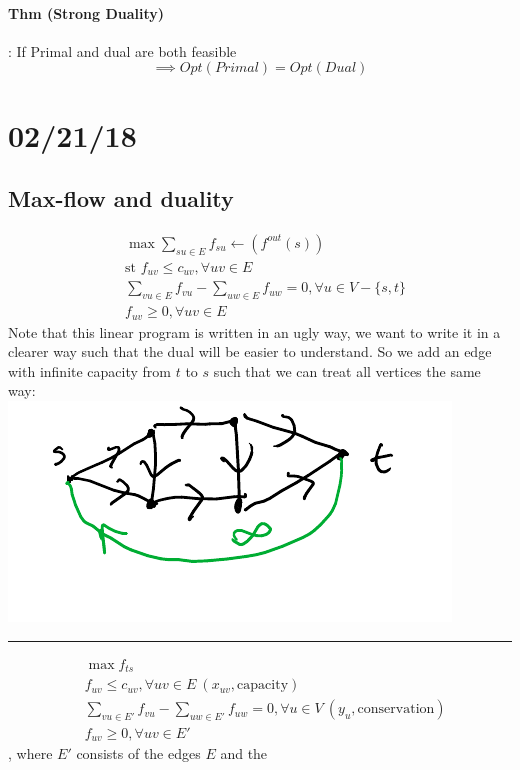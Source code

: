 \documentclass[12 pt]{article}
\begin{document}
          \paragraph{Thm (Strong Duality)}: If Primal and dual are
          both feasible $$\implies Opt(Primal) = Opt(Dual)$$
          \section{02/21/18}
          \subsection{Max-flow and duality}
          \begin{align*}
            &\max \sum_{su\in E} f_{su} \gets (f^{out}(s))
            \\ &\text{st }f_{uv} \leq c_{uv}, \forall uv \in E
            \\ &\sum_{vu\in E}f_{vu} - \sum_{uw \in E}f_{uw} = 0, \forall u \in V-\{s,t\}
            \\ &f_{uv} \geq 0, \forall uv \in E
          \end{align*}
          Note that this linear program is written in an ugly way, we
          want to write it in a clearer way such that the dual will
          be easier to understand. So we add an edge with infinite
          capacity from $t$ to $s$ such that we can treat all vertices
          the same way:
          \\ \includegraphics[width=.9\textwidth]{i110.pdf}
          \\ \noindent \rule{\textwidth}{0.5pt}
          \begin{align*}
            &\max f_{ts}
            \\ &f_{uv} \leq c_{uv}, \forall uv\in E \ (x_{uv}, \text{capacity})
            \\ &\sum_{vu \in E'}f_{vu} - \sum_{uw \in E'}f_{uw}=0, \forall u \in V \ (y_u,\text{conservation})
            \\ &f_{uv} \geq 0, \forall uv\in E'
          \end{align*}, where $E'$ consists of the edges $E$ and the
\end{document}
